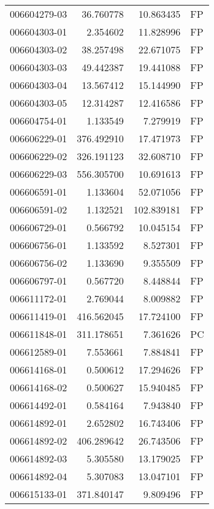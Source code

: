 \begin{tabular}{lrrl}
006604279-03 &   36.760778 &      10.863435 &   FP \\
006604303-01 &    2.354602 &      11.828996 &   FP \\
006604303-02 &   38.257498 &      22.671075 &   FP \\
006604303-03 &   49.442387 &      19.441088 &   FP \\
006604303-04 &   13.567412 &      15.144990 &   FP \\
006604303-05 &   12.314287 &      12.416586 &   FP \\
006604754-01 &    1.133549 &       7.279919 &   FP \\
006606229-01 &  376.492910 &      17.471973 &   FP \\
006606229-02 &  326.191123 &      32.608710 &   FP \\
006606229-03 &  556.305700 &      10.691613 &   FP \\
006606591-01 &    1.133604 &      52.071056 &   FP \\
006606591-02 &    1.132521 &     102.839181 &   FP \\
006606729-01 &    0.566792 &      10.045154 &   FP \\
006606756-01 &    1.133592 &       8.527301 &   FP \\
006606756-02 &    1.133690 &       9.355509 &   FP \\
006606797-01 &    0.567720 &       8.448844 &   FP \\
006611172-01 &    2.769044 &       8.009882 &   FP \\
006611419-01 &  416.562045 &      17.724100 &   FP \\
006611848-01 &  311.178651 &       7.361626 &   PC \\
006612589-01 &    7.553661 &       7.884841 &   FP \\
006614168-01 &    0.500612 &      17.294626 &   FP \\
006614168-02 &    0.500627 &      15.940485 &   FP \\
006614492-01 &    0.584164 &       7.943840 &   FP \\
006614892-01 &    2.652802 &      16.743406 &   FP \\
006614892-02 &  406.289642 &      26.743506 &   FP \\
006614892-03 &    5.305580 &      13.179025 &   FP \\
006614892-04 &    5.307083 &      13.047101 &   FP \\
006615133-01 &  371.840147 &       9.809496 &   FP \\

\end{tabular}
